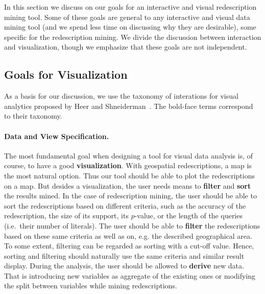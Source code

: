 \documentclass{llncs}
\begin{document}
In this section we discuss on our goals for an interactive and visual
redescription mining tool. Some of these goals are general to any
interactive and visual data mining tool (and we spend less time on
discussing why they are desirable), some specific for the
redescription mining. We divide the discussion between interaction and
visualization, though we emphasize that these goals are not independent.

\subsection{Goals for Visualization}
\label{sec:goals-visualization}
As a basis for our discussion, we use the taxonomy of interations for
visual analytics proposed by Heer and
Shneiderman~\cite{Heer:2012:IDV:2133806.2133821}. The bold-face terms
correspond to their taxonomy.

\paragraph{Data and View Specification.}
The most fundamental goal when designing a tool for visual data
analysis is, of course, to have a good \textbf{visualization}. With
geospatial redescriptions, a map is the most natural option. Thus our
tool should be able to plot the redescriptions on a map. But desides a
visualization, the user needs means to \textbf{filter} and
\textbf{sort} the results mined. In the case of redescription mining,
the user should be able to sort the redescriptions based on different
criteria, such as the accuracy of the redescription, the size of its
support, its $p$-value, or the length of the queries (i.e.\ their
number of literals).  The user should be able to \textbf{filter} the
redescriptions based on these same criteria as well as on, e.g. the
described geographical area.  To some extent, filtering can be
regarded as sorting with a cut-off value. Hence, sorting and filtering
should naturally use the same criteria and similar result display.
During the analysis, the user should be allowed to \textbf{derive} new
data. That is introducing new variables as aggregate of the existing
ones or modifying the split between variables while mining
redescriptions.
\end{document}
